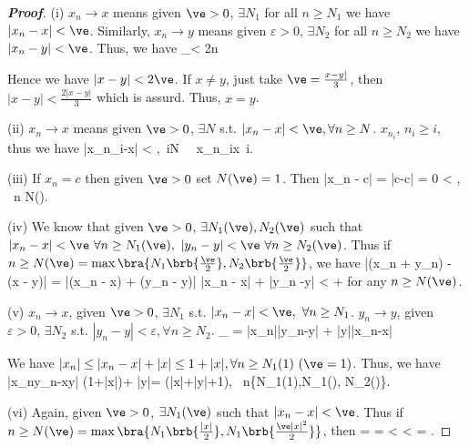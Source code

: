 \begin{proof}[\bf Proof]
\ben
\item [(i)] $x_n\to x$ means given $\ve>0$, $\exists N_1$ for all $n\geq N_1$ we have $|x_n-x|<\ve$. Similarly, $x_n\to y$ means given $\varepsilon>0$, $\exists N_2$ for all $n\geq N_2$ we have $|x_n-y|<\ve$. Thus, we have
\be
{}_{}< 2\ve {}n\geq \max{}
\ee

Hence we have $|x-y|<2\ve$. If $x\neq y$, just take $\ve=\frac{x-y|}{3}$, then $|x-y|<\frac{2|x-y|}{3}$ which is assurd. Thus, $x=y$.

\item [(ii)] $x_n\to x$ means given $\ve >0$, $\exists N$ s.t. $|x_n-x|<\ve, \forall n\geq N$. $x_{n_i}$, $n_i\geq i$, thus we have
\be
|x_{n_i}-x| < \varepsilon,\ \forall i\geq N \ \ra \ x_{n_i}\to x\ i\to\infty.
\ee

\item [(iii)] If $x_n = c$ then given $\ve > 0$ set $N(\ve) = 1$. Then
\be
|x_n - c| = |c-c| = 0 < \ve, \ \forall n \geq N(\ve).
\ee

\item [(iv)] We know that given $\ve > 0$, $\exists N_1(\ve),N_2(\ve)$ such that $|x_n - x| < \ve\ \forall n \geq N_1(\ve),\ |y_n - y| < \ve\ \forall n \geq N_2(\ve)$. Thus if $n \geq N(\ve) = \max\bra{N_1\brb{\frac{\ve}2}, N_2\brb{\frac{\ve}2}}$, we have
\be
|(x_n + y_n) - (x - y)| = |(x_n - x) + (y_n - y)| \leq |x_n - x| + |y_n -y| <  + 
\ee
for any $n \geq N(\ve)$.

\item [(v)] $x_n\to x$, given $\ve>0$, $\exists N_1$ s.t. $|x_n-x|<\ve, \ \forall n\geq N_1$. $y_n\to y$, given $\varepsilon>0$, $\exists N_2$ s.t. $|y_n-y|<\varepsilon, \forall n\geq N_2$.
\be
{}_{} = |x_n||y_n-y| + |y||x_n-x|
\ee

We have $|x_n|\leq |x_n-x|+|x|\leq 1+|x|,\forall n\geq N_1(1) \ (\ve=1)$. Thus, we have
\be
|x_ny_n-xy| \leq (1+|x|)\ve + |y|\ve = \ve(|x|+|y|+1), \ \forall n\geq \max\{N_1(1),N_1(\ve), N_2(\ve)\}.
\ee

\item [(vi)] Again, given $\ve > 0$, $\exists N_1(\ve)$ such that $|x_n -x| < \ve$. Thus if $n \geq N(\ve) = \max\bra{N_1\brb{\frac{|x|}{2}}, N_1\brb{\frac{\ve|x|^2}{2}}}$, then
\be
{} =  =  < < \cdot {} = \ve.
\ee


\end{proof}
